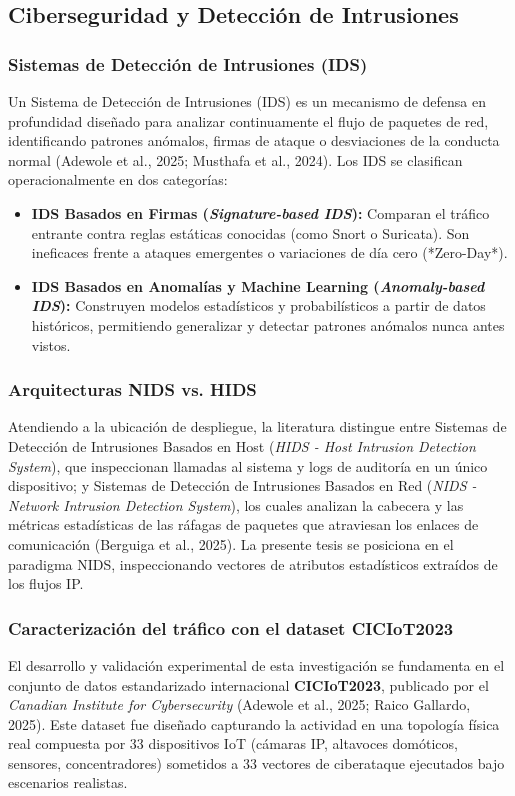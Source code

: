 \subsection{Ciberseguridad y Detección de Intrusiones}

\subsubsection{Sistemas de Detección de Intrusiones (IDS)}
Un Sistema de Detección de Intrusiones (IDS) es un mecanismo de defensa en profundidad diseñado para analizar continuamente el flujo de paquetes de red, identificando patrones anómalos, firmas de ataque o desviaciones de la conducta normal (Adewole et al., 2025; Musthafa et al., 2024). Los IDS se clasifican operacionalmente en dos categorías:
\begin{itemize}
    \item \textbf{IDS Basados en Firmas (\textit{Signature-based IDS}):} Comparan el tráfico entrante contra reglas estáticas conocidas (como Snort o Suricata). Son ineficaces frente a ataques emergentes o variaciones de día cero (*Zero-Day*).
    \item \textbf{IDS Basados en Anomalías y Machine Learning (\textit{Anomaly-based IDS}):} Construyen modelos estadísticos y probabilísticos a partir de datos históricos, permitiendo generalizar y detectar patrones anómalos nunca antes vistos.
\end{itemize}

\subsubsection{Arquitecturas NIDS vs. HIDS}
Atendiendo a la ubicación de despliegue, la literatura distingue entre Sistemas de Detección de Intrusiones Basados en Host (\textit{HIDS - Host Intrusion Detection System}), que inspeccionan llamadas al sistema y logs de auditoría en un único dispositivo; y Sistemas de Detección de Intrusiones Basados en Red (\textit{NIDS - Network Intrusion Detection System}), los cuales analizan la cabecera y las métricas estadísticas de las ráfagas de paquetes que atraviesan los enlaces de comunicación (Berguiga et al., 2025). La presente tesis se posiciona en el paradigma NIDS, inspeccionando vectores de atributos estadísticos extraídos de los flujos IP.

\subsubsection{Caracterización del tráfico con el dataset CICIoT2023}
El desarrollo y validación experimental de esta investigación se fundamenta en el conjunto de datos estandarizado internacional \textbf{CICIoT2023}, publicado por el \textit{Canadian Institute for Cybersecurity} (Adewole et al., 2025; Raico Gallardo, 2025). Este dataset fue diseñado capturando la actividad en una topología física real compuesta por 33 dispositivos IoT (cámaras IP, altavoces domóticos, sensores, concentradores) sometidos a 33 vectores de ciberataque ejecutados bajo escenarios realistas.


